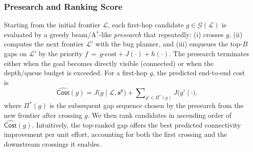 \subsubsection{Presearch and Ranking Score}
\label{subsubsec:gap-ranking-rule}
Starting from the initial frontier $\mathcal{L}$, each first-hop candidate
$g\in\mathcal{G}(\mathcal{L})$ is evaluated by a greedy beam/A$^\ast$-like
\emph{presearch} that repeatedly: (i) crosses $g$, (ii) computes the next
frontier $\mathcal{L}'$ with the bug planner, and (iii) enqueues the
top-$B$ gaps on $\mathcal{L}'$ by the priority
\(
f \,=\, g\text{-cost} + J(\cdot) + h(\cdot).
\)
The presearch terminates either when the goal becomes directly visible
(connected) or when the depth/queue budget is exceeded. For a first-hop $g$,
the predicted end-to-end cost is
\begin{equation}\label{eq:total-cost}
\widehat{\mathsf{Cost}}(g)
= J\big(g \mid \mathcal{L}, \mathbf{s}^{\texttt{S}}\big)
+ \sum\nolimits_{g'\in\Pi^*(g)} J\big(g' \mid \cdot\big).
\end{equation}
where $\Pi^*(g)$ is the subsequent gap sequence chosen by the presearch from
the new frontier after crossing $g$. We then rank candidates in ascending order
of $\widehat{\mathsf{Cost}}(g)$.
Intuitively, the top-ranked gap offers the best predicted connectivity
improvement per unit effort, accounting for both the first crossing and the
downstream crossings it enables.

